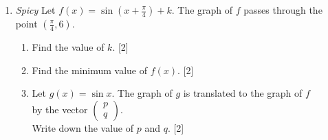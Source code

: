 \documentclass[12pt, twoside]{article}
\begin{document}
\begin{enumerate}
\begin{enumerate}
        \hfill [3]
  \end{enumerate}

\item \emph{Spicy} Let $\displaystyle f(x)=\sin (x+\frac{\pi}{4})+k$. The graph of $f$ passes through the point $\displaystyle (\frac{\pi}{4}, 6)$.
\begin{enumerate}
  \item Find the value of $k$. \hfill [2]
  \item Find the minimum value of $f(x)$. \hfill [2]
  \item Let $g(x)=\sin x$. The graph of $g$ is translated to the graph of $f$\\ by the vector
    $\left( \begin{array}{c}
      p\\
      q
      \end{array} \right)$.
      \\
  Write down the value of $p$ and $q$.  \hfill [2]
  \end{enumerate}

\end{enumerate}
\end{document}
